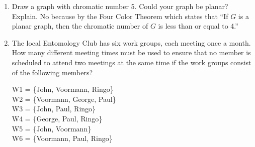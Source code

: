 \documentclass[11pt, letterpaper, includehead]{article}
\theoremstyle{plain}
\theoremstyle{mydefinition}
\theoremstyle{myproperty}
\begin{document}
\begin{enumerate}[label=\textbf{\arabic*}., leftmargin=*]
          \begin{center}
            \end{center}
    \item Draw a graph with chromatic number 5. Could your graph be planar? Explain.
    No because by the Four Color Theorem which states that ``If $G$ is a planar graph, then the chromatic number of $G$ is less than or equal to 4.'' 

    \begin{center}
    \end{center}


    \item The local Entomology Club has six work groups, each meeting once a month. How many different meeting times must be used to ensure that no member is scheduled to attend two meetings at the same time if the work groups consist of the following members?
    
    W1 = \{John, Voormann, Ringo\}\\
    W2 = \{Voormann, George, Paul\}\\
    W3 = \{John, Paul, Ringo\}\\
    W4 = \{George, Paul, Ringo\}\\
    W5 = \{John, Voormann\}\\
    W6 = \{Voormann, Paul, Ringo\}\\
\end{enumerate}
\end{document}
